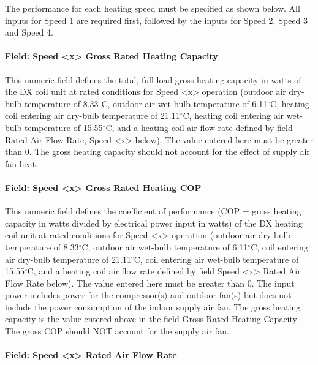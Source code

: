 The performance for each heating speed must be specified as shown below. All inputs for Speed 1 are required first, followed by the inputs for Speed 2, Speed 3 and Speed 4.

\paragraph{Field: Speed \textless{}x\textgreater{} Gross Rated Heating Capacity}\label{field-speed-x-gross-rated-heating-capacity}

This numeric field defines the total, full load gross heating capacity in watts of the DX coil unit at rated conditions for Speed \textless{}x\textgreater{} operation (outdoor air dry-bulb temperature of 8.33$^\circ$C, outdoor air wet-bulb temperature of 6.11$^\circ$C, heating coil entering air dry-bulb temperature of 21.11$^\circ$C, heating coil entering air wet-bulb temperature of 15.55$^\circ$C, and a heating coil air flow rate defined by field Rated Air Flow Rate, Speed \textless{}x\textgreater{} below). The value entered here must be greater than 0. The gross heating capacity should not account for the effect of supply air fan heat.

\paragraph{Field: Speed \textless{}x\textgreater{} Gross Rated Heating COP}\label{field-speed-x-gross-rated-heating-cop}

This numeric field defines the coefficient of performance (COP = gross heating capacity in watts divided by electrical power input in watts) of the DX heating coil unit at rated conditions for Speed \textless{}x\textgreater{} operation (outdoor air dry-bulb temperature of 8.33$^\circ$C, outdoor air wet-bulb temperature of 6.11$^\circ$C, coil entering air dry-bulb temperature of 21.11$^\circ$C, coil entering air wet-bulb temperature of 15.55$^\circ$C, and a heating coil air flow rate defined by field Speed \textless{}x\textgreater{} Rated Air Flow Rate below). The value entered here must be greater than 0. The input power includes power for the compressor(s) and outdoor fan(s) but does not include the power consumption of the indoor supply air fan. The gross heating capacity is the value entered above in the field Gross Rated Heating Capacity . The gross COP should NOT account for the supply air fan.

\paragraph{Field: Speed \textless{}x\textgreater{} Rated Air Flow Rate}\label{field-speed-x-rated-air-flow-rate-1}

